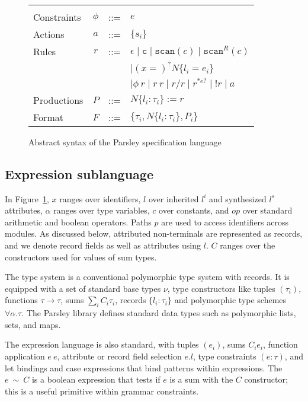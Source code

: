 \documentclass[letterpaper]{article}
\newcommand{\utv}{\alpha}             %
\begin{document}
\begin{figure}
\begin{tabular}{l c l l}
                 &          &     & \\
    Constraints  & $\phi$   & ::= & $ e $ \\
    Actions      & $a$      & ::= & $ \{s_i\} $ \\
    Rules        & $r$      & ::= & $ \epsilon \mid \texttt{c} \mid \texttt{scan}(c) \mid \texttt{scan}^R(c) $\\
                 &          &     & $\mid (x=)^?N\{l_i=e_i\} $ \\
                 &          &     & $ \mid \phi\ r \mid r\ r \mid r / r \mid r^{*e?} \mid !r \mid a $ \\
    Productions  & $P$      & ::= & $ N\{l_i:\tau_i\} := r $ \\
    Format       & $F$      & ::= & $ \{ \tau_i, N\{l_i:\tau_i\}, P_i \} $ \\
  \end{tabular}
  \caption{Abstract syntax of the Parsley specification language}
  \label{f:parsley-syntax}
\end{figure}

\subsection*{Expression sublanguage}
\label{ss:lang:expr}

In Figure~\ref{f:parsley-syntax}, $x$ ranges over identifiers, $l$
over inherited $l^i$ and synthesized $l^s$ attributes, $\utv$ ranges
over type variables, $c$ over constants, and $op$ over standard
arithmetic and boolean operators.  Paths $p$ are used to access
identifiers across modules.  As discussed below, attributed
non-terminals are represented as records, and we denote record fields
as well as attributes using $l$.  $C$ ranges over the constructors
used for values of sum types.

The type system is a conventional polymorphic type system
with records.  It is equipped with a set of standard base types $\nu$, type
constructors like tuples $(\tau_i)$, functions $\tau\rightarrow\tau$,
sums $\sum_iC_i\tau_i$, records $\{l_i:\tau_i\}$ and
polymorphic type schemes $\forall\utv.\tau$.  The Parsley library
defines standard data types such as polymorphic lists, sets, and maps.

The expression language is also standard, with tuples $(e_i)$, sums
$C_i e_i$, function application $e\ e$, attribute or record field
selection $e.l$, type constraints $(e:\tau)$, and let bindings and
case expressions that bind patterns within expressions.  The
$e\ \sim\ C$ is a boolean expression that tests if $e$ is a sum with
the $C$ constructor; this is a useful primitive within grammar
constraints.
\end{document}
